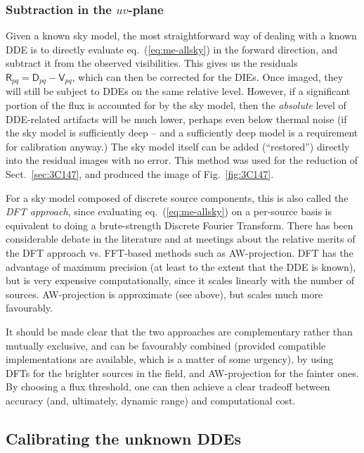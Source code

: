 \documentclass[]{aa}
\newcommand{\coh}[2]{\mathsf{{#1}}_{{#2}}}
\begin{document}
\subsubsection{Subtraction in the $uv$-plane\label{sec:subtraction-uv-plane}}

Given a known sky model, the most straightforward way of dealing with a known DDE is to directly evaluate eq.~(\ref{eq:me-allsky}) in the forward direction, and subtract it from the observed visibilities. This gives us the residuals $\coh{R}{pq} = \coh{D}{pq} - \coh{V}{pq}$, which can then be corrected for the DIEs. Once imaged, they will still be subject to DDEs on the same relative level. However, if a significant portion of the flux is accounted for by the sky model, then the \emph{absolute} level of DDE-related artifacts will be much lower, perhaps even below thermal noise (if the sky model is sufficiently deep -- and a sufficiently deep model is a requirement for calibration anyway.) The sky model itself can be added (``restored'') directly into the residual images with no error. This method was used for the reduction of Sect.~\ref{sec:3C147}, and produced the image of Fig.~\ref{fig:3C147}.

For a sky model composed of discrete source components, this is also called the \emph{DFT approach}, since evaluating eq.~(\ref{eq:me-allsky}) on a per-source basis is equivalent to doing a brute-strength Discrete Fourier Transform. There has been considerable debate in the literature and at meetings about the relative merits of the DFT approach vs. FFT-based methods such as AW-projection. DFT has the advantage of maximum precision (at least to the extent that the DDE is known), but is very expensive computationally, since it scales linearly with the number of sources. AW-projection is approximate (see above), but scales much more favourably. 

It should be made clear that the two approaches are complementary rather than mutually exclusive, and can be favourably combined (provided compatible implementations are available, which is a matter of some urgency), by using DFTs for the brighter sources in the field, and AW-projection for the fainter ones. By choosing a flux threshold, one can then achieve a clear tradeoff between accuracy (and, ultimately, dynamic range) and computational cost. 

\subsection{Calibrating the unknown DDEs}
\end{document}
